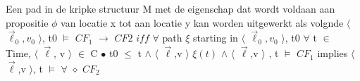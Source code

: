\documentclass{article}
\begin{document}
	Een pad in de kripke structuur M  met de eigenschap dat wordt voldaan aan propositie $\phi$ van locatie x tot aan locatie y kan worden uitgewerkt als volgnde
	$\langle$  $\overrightarrow{\ell}_0, v_0$  $\rangle$, t0 $\models$ $CF_1$ $\rightarrow$ $CF2$ $iff$ $\forall$ path $ \xi$ starting in $\langle$  $\overrightarrow{\ell}_0, v_0$  $\rangle$, t0 
	$\forall$ t $\in$ Time, $\langle$  $\overrightarrow{\ell}$, v  $\rangle$ $\in$  C $\bullet$ t0 $\leq$ t $\wedge$ $\langle$ $\overrightarrow{\ell}$,v $\rangle$ \in $\xi(t)$ $\wedge$ $\langle$ $\overrightarrow{\ell}$,v $\rangle$ , t $\models$ $CF_1$ implies $\langle$ $\overrightarrow{\ell}$,v $\rangle$, t $\models$ $\forall$ $\diamond$ $CF_2$
	\cite[p.180]{realtimeForms}
	
\end{document}
